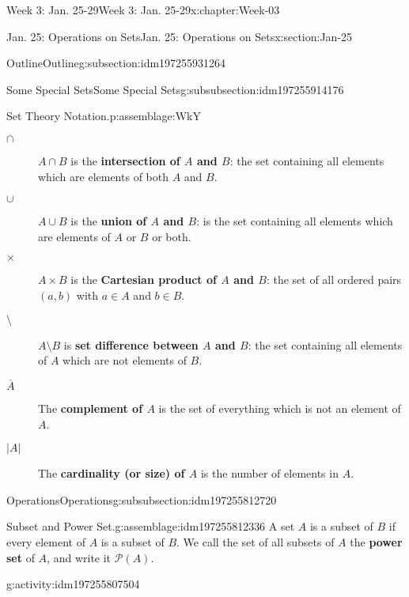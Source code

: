 \documentclass[oneside,10pt,]{book}
\newcommand{\terminology}[1]{\textbf{#1}}
\numberwithin{equation}{section}
\def\pow{{\mathcal P}}
\newcommand{\pow}{\mathcal P}
\renewcommand{\bar}{\overline}
\newcommand{\card}[1]{\left| #1 \right|}
\begin{document}
\begin{chapterptx}{Week 3: Jan. 25-29}{}{Week 3: Jan. 25-29}{}{}{x:chapter:Week-03}
\begin{sectionptx}{Jan. 25: Operations on Sets}{}{Jan. 25: Operations on Sets}{}{}{x:section:Jan-25}
\begin{subsectionptx}{Outline}{}{Outline}{}{}{g:subsection:idm197255931264}
\begin{subsubsectionptx}{Some Special Sets}{}{Some Special Sets}{}{}{g:subsubsection:idm197255914176}
\begin{assemblage}{Set Theory Notation.}{p:assemblage:WkY}
\begin{description}
\item[{\(\cap\)}]\(A \cap B\) is the \terminology{intersection of \(A\) and \(B\)}: the set containing all elements which are elements of both \(A\) and \(B\). \label{g:notation:idm197255847328}%
\item[{\(\cup\)}]\(A \cup B\) is the \terminology{union of \(A\) and \(B\)}: is the set containing all elements which are elements of \(A\) or \(B\) or both. \label{g:notation:idm197255840784}%
\item[{\(\times\)}]\(A \times B\) is the \terminology{Cartesian product of \(A\) and \(B\)}: the set of all ordered pairs \((a,b)\) with \(a \in A\) and \(b \in B\). \label{g:notation:idm197255833984}%
\item[{\(\setminus\)}]\(A \setminus B\) is \terminology{set difference between \(A\) and \(B\)}: the set containing all elements of \(A\) which are not elements of \(B\). \label{g:notation:idm197255827184}%
\item[{\(\bar{A}\)}]The \terminology{complement of \(A\)} is the set of everything which is not an element of \(A\). \label{g:notation:idm197255822000}%
\item[{\(\card{A}\)}]The \terminology{cardinality (or size) of \(A\)} is the number of elements in \(A\). \label{g:notation:idm197255816560}%
\end{description}
%
\end{assemblage}
\end{subsubsectionptx}
%
%
\typeout{************************************************}
\typeout{************************************************}
%
\begin{subsubsectionptx}{Operations}{}{Operations}{}{}{g:subsubsection:idm197255812720}
\begin{assemblage}{Subset and Power Set.}{g:assemblage:idm197255812336}%
A set \(A\) is a subset of \(B\) if every element of \(A\) is a subset of \(B\). We call the set of all subsets of \(A\) the \terminology{power set} of \(A\), and write it \(\pow(A)\).%
\end{assemblage}
\begin{activity}{}{g:activity:idm197255807504}%

\end{activity}
\end{subsubsectionptx}
\end{subsectionptx}
\end{sectionptx}
\end{chapterptx}
\end{document}

